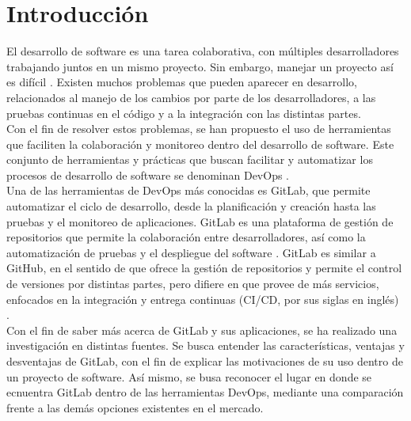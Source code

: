 \documentclass[runningheads]{llncs}
\begin{document}
\section{Introducción}
El desarrollo de software es una tarea colaborativa, con múltiples desarrolladores trabajando juntos en
un mismo proyecto. Sin embargo, manejar un proyecto así es difícil \cite{fairbanks2023analyzing}. Existen
muchos problemas que pueden aparecer en desarrollo, relacionados al manejo de los cambios por parte de los
desarrolladores, a las pruebas continuas en el código y a la integración con las distintas partes.\\
Con el fin de resolver estos problemas, se han propuesto el uso de herramientas que faciliten la colaboración
y monitoreo dentro del desarrollo de software. Este conjunto de herramientas y prácticas que buscan facilitar
y automatizar los procesos de desarrollo de software se denominan DevOps \cite{gitlab2022gitlab}.\\
Una de las herramientas de DevOps más conocidas es GitLab, que permite automatizar el ciclo de desarrollo,
desde la planificación y creación hasta las pruebas y el monitoreo de aplicaciones. GitLab es una plataforma
de gestión de repositorios que permite la colaboración entre desarrolladores, así como la automatización de
pruebas y el despliegue del software \cite{safari2020analysis}. GitLab es similar a GitHub, en el sentido de que
ofrece la gestión de repositorios y permite el control de versiones por distintas partes, pero difiere en
que provee de más servicios, enfocados en la integración y entrega continuas (CI/CD, por sus siglas en inglés) \cite{safari2020analysis}.\\
Con el fin de saber más acerca de GitLab y sus aplicaciones, se ha realizado una investigación en
distintas fuentes. Se busca entender las características, ventajas y desventajas de GitLab, con el fin
de explicar las motivaciones de su uso dentro de un proyecto de software. Así mismo, se busa reconocer el
lugar en donde se ecnuentra GitLab dentro de las herramientas DevOps, mediante una comparación frente a las demás
opciones existentes en el mercado.
\end{document}

